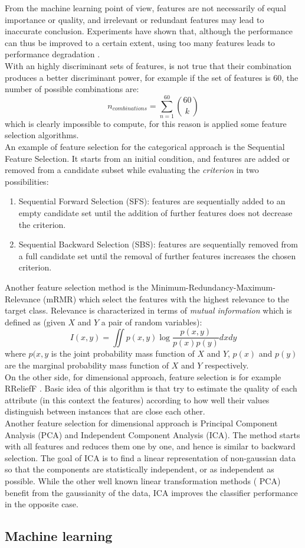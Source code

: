 From the machine learning point of view, features are not necessarily of equal importance or quality, and irrelevant or redundant features may lead to inaccurate conclusion. Experiments have shown that, although the performance can thus be improved to a certain extent, using too many features leads to performance degradation \cite{zhang2017feature}.
\\
With an highly discriminant sets of features, is not true that their combination produces a better discriminant power, for example if the set of features is 60, the number of possible combinations are:
\begin{equation}
	n_{combinations} = \sum_{n=1}^{60} \binom{60}{k}
\end{equation}
which is clearly impossible to compute, for this reason is applied some feature selection algorithms.
\\ \indent
An example of feature selection for the categorical approach is the Sequential Feature Selection. It starts from an initial condition, and features are added or removed from a candidate subset while evaluating the \textit{criterion} in two possibilities:
\begin{enumerate}
	\item Sequential Forward Selection (SFS): features are sequentially added to an empty candidate set until the addition of further features does not decrease the criterion.
	\item Sequential Backward Selection (SBS): features are sequentially removed from a full candidate set until the removal of further features increases the chosen criterion.
\end{enumerate}
Another feature selection method is the Minimum-Redundancy-Maximum-Relevance (mRMR) which select the features with the highest relevance to the target class. Relevance is characterized in terms of \textit{mutual information} which is defined as (given $X$ and $Y$ a pair of random variables):
\begin{equation}
	I(x,y)=\iint p(x,y) \log\dfrac{p(x,y)}{p(x)p(y)} dxdy
\end{equation}
where $p(x,y$ is the joint probability mass function of $X$ and $Y$, $p(x)$ and $p(y)$ are the marginal probability mass function of $X$ and $Y$ respectively.
\\ \indent
On the other side, for dimensional approach, feature selection is for example RReliefF \cite{robnik2003theoretical}. Basic idea of this algorithm is that try to estimate the quality of each attribute (in this context the features) according to how well their values distinguish between instances that are close each other.
\\ \indent
Another feature selection for dimensional approach is Principal Component Analysis (PCA) and Independent Component Analysis (ICA). The method starts with all features and reduces them one by one, and hence is similar to backward selection. The goal of ICA is to find a linear representation of non-gaussian data so that the components are statistically independent, or as independent as possible. While the other well known linear transformation methods ( PCA) benefit from the gaussianity of the data, ICA improves the classifier performance in the opposite case.

\subsection{Machine learning}


